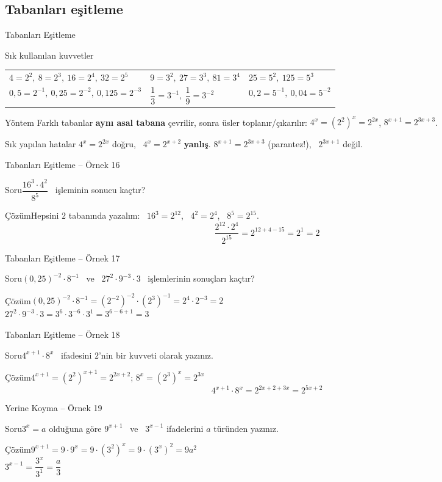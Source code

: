 \documentclass[aspectratio=169,11pt]{beamer}
\newcommand{\soru}[3]{%
\begin{frame}{#1}
  \begin{block}{Soru}\large #2\end{block}
  \pause
  \begin{exampleblock}{Çözüm}\large #3\end{exampleblock}
\end{frame}}
\begin{document}
\subsection{Tabanları eşitleme}
\begin{frame}{Tabanları Eşitleme}
\begin{block}{Sık kullanılan kuvvetler}
\renewcommand{\arraystretch}{1.25}
\begin{tabular}{lll}
\(4=2^2,\ 8=2^3,\ 16=2^4,\ 32=2^5\) & \(9=3^2,\ 27=3^3,\ 81=3^4\) & \(25=5^2,\ 125=5^3\)\\
\(0{,}5=2^{-1},\ 0{,}25=2^{-2},\ 0{,}125=2^{-3}\) & \(\dfrac13=3^{-1},\ \dfrac19=3^{-2}\) & \(0{,}2=5^{-1},\ 0{,}04=5^{-2}\)
\end{tabular}
\end{block}
\begin{block}{Yöntem}
Farklı tabanlar \textbf{aynı asal tabana} çevrilir, sonra üsler toplanır/çıkarılır:\quad
\(4^x=(2^2)^x=2^{2x}\), \quad \(8^{x+1}=2^{3x+3}\).
\end{block}
\begin{alertblock}{Sık yapılan hatalar}
\(4^x=2^{2x}\) doğru, \ \(4^x=2^{x+2}\) \textbf{yanlış}. \quad \(8^{x+1}=2^{3x+3}\) (parantez!), \ \(2^{3x+1}\) değil.
\end{alertblock}
\end{frame}

\soru{Tabanları Eşitleme -- Örnek 16}
{\(\dfrac{16^3\cdot 4^2}{8^5}\) \ işleminin sonucu kaçtır?}
{Hepsini \(2\) tabanında yazalım: \ \(16^3=2^{12}\), \ \(4^2=2^4\), \ \(8^5=2^{15}\).
\[\frac{2^{12}\cdot 2^{4}}{2^{15}}=2^{12+4-15}=2^1=2\]}

\soru{Tabanları Eşitleme -- Örnek 17}
{\((0{,}25)^{-2}\cdot 8^{-1}\) \ ve \ \(27^2\cdot 9^{-3}\cdot 3\) \ işlemlerinin sonuçları kaçtır?}
{\((0{,}25)^{-2}\cdot 8^{-1}=(2^{-2})^{-2}\cdot (2^3)^{-1}=2^{4}\cdot 2^{-3}=2\)\\[4pt]
\(27^2\cdot 9^{-3}\cdot 3=3^{6}\cdot 3^{-6}\cdot 3^1=3^{6-6+1}=3\)}

\soru{Tabanları Eşitleme -- Örnek 18}
{\(4^{x+1}\cdot 8^{x}\) \ ifadesini \(2\)'nin bir kuvveti olarak yazınız.}
{\(4^{x+1}=(2^2)^{x+1}=2^{2x+2}\); \qquad \(8^{x}=(2^3)^{x}=2^{3x}\)
\[4^{x+1}\cdot 8^{x}=2^{2x+2+3x}=2^{5x+2}\]}

\soru{Yerine Koyma -- Örnek 19}
{\(3^x=a\) olduğuna göre \(9^{x+1}\) \ ve \ \(3^{x-1}\) ifadelerini \(a\) türünden yazınız.}
{\(9^{x+1}=9\cdot 9^{x}=9\cdot (3^2)^x=9\cdot (3^x)^2=9a^2\)\\[4pt]
\(3^{x-1}=\dfrac{3^x}{3^1}=\dfrac{a}{3}\)}
\end{document}
